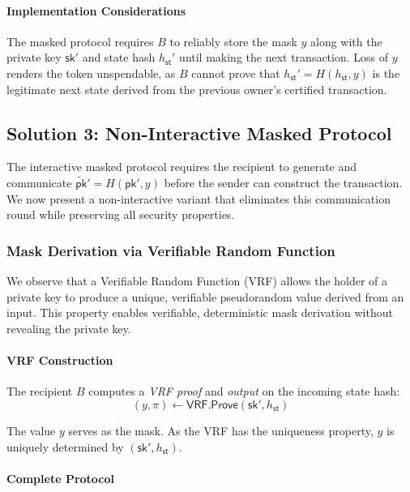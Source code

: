 \documentclass{article}
\newcommand{\pubkey}[0]{\mathsf{pk}}
\newcommand{\prikey}[0]{\mathsf{sk}}
\newcommand{\mpubkey}{\widetilde{\pubkey}}
\newcommand{\sthash}[0]{{h_\mathsf{st}}}
\begin{document}
\paragraph{Implementation Considerations}

The masked protocol requires $B$ to reliably store the mask $y$ along with the private key $\prikey'$ and state hash $\sthash'$ until making the next transaction. Loss of $y$ renders the token unspendable, as $B$ cannot prove that $\sthash' = H(\sthash, y)$ is the legitimate next state derived from the previous owner's certified transaction.


\subsection{Solution 3: Non-Interactive Masked Protocol}\label{sec:non-interactive-masked-protocol}

The interactive masked protocol requires the recipient to generate and communicate $\mpubkey' = H(\pubkey', y)$ before the sender can construct the transaction. We now present a non-interactive variant that eliminates this communication round while preserving all security properties.

\subsubsection{Mask Derivation via Verifiable Random Function}

We observe that a Verifiable Random Function (VRF) allows the holder of a private key to produce a unique, verifiable pseudorandom value derived from an input. This property enables verifiable, deterministic mask derivation without revealing the private key.

\paragraph{VRF Construction}

The recipient $B$ computes a \emph{VRF proof} and \emph{output} on the incoming state hash:
\[
(y, \pi) \gets \mathsf{VRF.Prove}(\prikey', \sthash)
\]

The value $y$ serves as the mask. As the VRF has the uniqueness property, $y$ is uniquely determined by $(\prikey', \sthash)$.

\paragraph{Complete Protocol}
\end{document}
